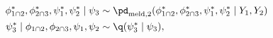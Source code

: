 \begin{align}
  \phi_{1 \cap 2}^{*}, \phi_{2 \cap 3}^{*}, \psi_{1}^{*}, \psi_{2}^{*} \mid \psi_{3} 
    &\sim 
    \pd_{\text{meld}, 2}(\phi_{1 \cap 2}^{*}, \phi_{2 \cap 3}^{*}, \psi_{1}^{*}, \psi_{2}^{*} \mid Y_{1}, Y_{2})
  \\
  \psi_{3}^{*} \mid \phi_{1 \cap 2}, \phi_{2 \cap 3}, \psi_{1}, \psi_{2} 
    &\sim
    \q(\psi_{3}^{*} \mid \psi_{3}),
  \label{eqn:stage-three-gibbs-updates}
\end{align}